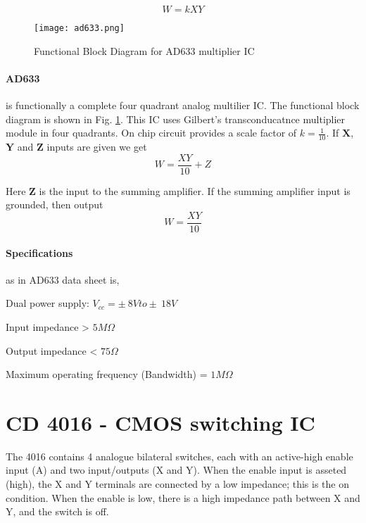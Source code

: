 \begin{equation}
W=kXY
\end{equation}

\begin{figure}[h]
\texttt{[image: ad633.png]}
\caption{Functional Block Diagram for AD633 multiplier IC}
\label{ad633}
\end{figure}

\paragraph{AD633} is functionally a complete four quadrant analog multilier IC. The functional block diagram is shown in Fig. \ref{ad633}. This IC uses Gilbert's transconducatnce multiplier module in four quadrants. On chip circuit provides a scale factor of $k=\frac{1}{10}$. If $\textbf{X}$, $\textbf{Y}$ and $\textbf{Z}$ inputs are given we get 
\begin{equation}
W=\frac{XY}{10}+Z
\end{equation}

Here $\textbf{Z}$ is the input to the summing amplifier. If the summing amplifier input is grounded, then output 
\begin{equation}
W=\frac{XY}{10}
\end{equation}

\paragraph{Specifications}as in AD633 data sheet is,

\noindent Dual power supply: $V_{cc}= \pm \ 8V to \pm \ 18V$

\noindent Input impedance > $5 M \Omega$

\noindent Output impedance < $75  \Omega$

\noindent Maximum operating frequency (Bandwidth) = $1 M\Omega$

\section{CD 4016 - CMOS switching IC}
The 4016 contains 4 analogue bilateral switches, each with an active-high enable input (A) and two input/outputs (X and Y). When the enable input is asseted (high), the X and Y terminals are connected by a low impedance; this is the on condition. When the enable is low, there is a high impedance path between X and Y, and the switch is off.

